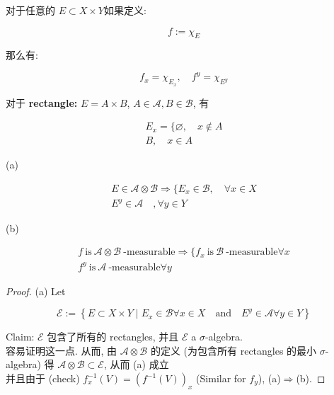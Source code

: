 \documentclass{qlnotes-export}
\begin{document}
\begin{example}\label{ex-06-product-measure-fubini-tonelli-example-002}

对于任意的 \(E \subset X \times Y\)如果定义:

\[f := \chi_{E}\]

那么有:

\[f_{x} = \chi_{E_{x}},\quad f^{y} = \chi_{E^{y}}\]

对于 \textbf{rectangle:} \(E = A \times B\), \(A \in \mathcal{A},B \in \mathcal{B}\), 有

\[\begin{matrix}
{E_{x} = \{\varnothing,\quad x \notin A} \\
{B,\quad x \in A}
\end{matrix}\]

\end{example}

\begin{proposition}\label{prop-06-product-measure-fubini-tonelli-proposition-005}

(a)

\[\begin{matrix}
{E \in \mathcal{A} \otimes \mathcal{B}\Longrightarrow\{ E_{x} \in \mathcal{B},\quad\forall x \in X} \\
{E^{y} \in \mathcal{A}\quad,\forall y \in Y}
\end{matrix}\]

(b)

\[\begin{matrix}
{f\ \text{is}\ \mathcal{A} \otimes \mathcal{B}\ \text{-measurable}\Longrightarrow\{ f_{x}\ \text{is}\ \mathcal{B}\ \text{-measurable}\forall x} \\
{f^{y}\ \text{is}\ \mathcal{A}\ \text{-measurable}\forall y}
\end{matrix}\]

\end{proposition}

\begin{proof}

(a) Let

\[\mathcal{E} := \left\{ {E \subset X \times Y \mid E_{x} \in \mathcal{B}\forall x \in X\quad\text{and}\quad E^{y} \in \mathcal{A}\forall y \in Y} \right\}\]

Claim: \(\mathcal{E}\) 包含了所有的 rectangles, 并且 \(\mathcal{E}\) a \(\sigma\)-algebra.\\
容易证明这一点. 从而, 由 \(\mathcal{A} \otimes \mathcal{B}\) 的定义 (为包含所有 rectangles 的最小 \(\sigma\)-algebra) 得 \(\mathcal{A} \otimes \mathcal{B} \subset \mathcal{E}\), 从而 (a) 成立\\
并且由于 (check) \(f_{x}^{- 1}(V) = (f^{- 1}(V))_{x}\) (Similar for \(f_{y}\)), (a)\(\Longrightarrow\)(b).

\end{proof}
\end{document}
